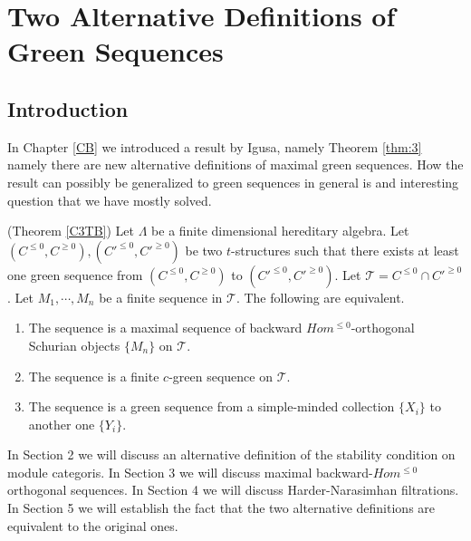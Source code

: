 \chapter{Two Alternative Definitions of Green Sequences}\label{C3}
\section{Introduction}
\indent In Chapter \ref{CB} we introduced a result by Igusa, namely Theorem \ref{thm:3} namely there are new alternative definitions of maximal green sequences. How the result can possibly be generalized to green sequences in general is and interesting question that we have mostly solved.\\
\begin{theorem}\label{C3T}
\indent (Theorem \ref{C3TB}) Let $\Lambda$ be a finite dimensional hereditary algebra. Let $(C^{\leq 0}, C^{\geq 0}), (C'^{\leq 0}, C'^{\geq 0})$ be two $t$-structures such that there exists at least one green sequence from $(C^{\leq 0}, C^{\geq 0})$ to $(C'^{\leq 0}, C'^{\geq 0})$. Let $\mathcal{T} = C^{\leq 0}\cap C'^{\geq 0}$.  Let $M_1,\cdots, M_n$ be a finite sequence in $\mathcal{T}$. The following are equivalent.
\begin{enumerate}
\item The sequence is a maximal sequence of backward $Hom^{\leq 0}$-orthogonal Schurian objects $\{M_n\}$ on $\mathcal{T}$.
\item The sequence is a finite $c$-green sequence on $\mathcal{T}$.
\item The sequence is a green sequence from a simple-minded collection $\{X_i\}$ to another one $\{Y_i\}$.
\end{enumerate}
\end{theorem}
\indent In Section 2 we will discuss an alternative definition of the stability condition on module categoris. In Section 3 we will discuss maximal backward-$Hom^{\leq 0}$ orthogonal sequences. In Section 4 we will discuss Harder-Narasimhan filtrations. In Section 5 we will establish the fact that the two alternative definitions are equivalent to the original ones.\\
